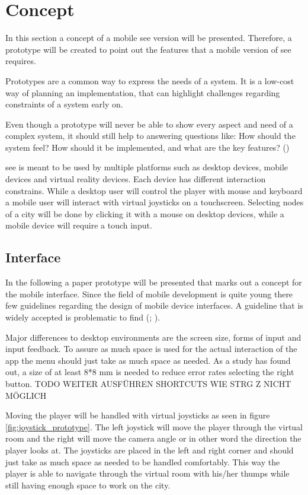 \section{Concept}
\label{section:concept}
In this section a concept of a mobile \gls{see} version will be presented. 
Therefore, a prototype will be created to point out the features that a mobile version of \gls{see} requires.

Prototypes are a common way to express the needs of a system. 
It is a low-cost way of planning an implementation, that can highlight challenges regarding constraints of a system early on.

Even though a prototype will never be able to show every aspect and need of a complex system, it should still help to answering questions like: 
How should the system feel? How should it be implemented, and what are the key features? (\cite{houde1997prototypes}) 

\gls{see} is meant to be used by multiple platforms such as desktop devices, mobile devices and virtual reality devices.
Each device has different interaction constrains. 
While a desktop user will control the player with mouse and keyboard a mobile user will interact with virtual joysticks on a touchscreen.
Selecting nodes of a \gls{city} will be done by clicking it with a mouse on desktop devices, while a mobile device will require a touch input.

\subsection{Interface}
\label{sec:interface}
In the following a paper prototype will be presented that marks out a concept for the mobile interface.
Since the field of mobile development is quite young there few guidelines regarding the design of mobile device interfaces.
A guideline that is widely accepted is problematic to find (\cite{renaud2017demarcating}; \cite{punchoojit2017usability}). 

Major differences to desktop environments are the screen size, forms of input and input feedback.
To assure as much space is used for the actual interaction of the app the menu should just take as much space as needed.
As a study has found out, a size of at least 8*8 mm is needed to reduce error rates selecting the right button. \cite{conradi2015optimal} \cite{parhi2006target}
TODO WEITER AUSFÜHREN
SHORTCUTS WIE STRG Z NICHT MÖGLICH
 \cite{adipat2005interface} 

Moving the player will be handled with virtual joysticks as seen in figure \ref{fig:joystick_prototype}.
The left joystick will move the player through the virtual room and the right will move the camera angle or in other word the direction the player looks at.
The joysticks are placed in the left and right corner and should just take as much space as needed to be handled comfortably.
This way the player is able to navigate through the virtual room with his/her thumps while still having enough space to work on the \gls{city}.

